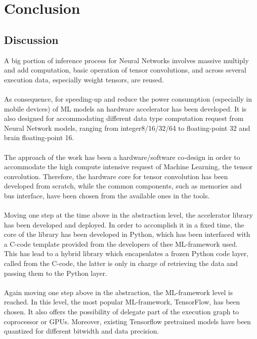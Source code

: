 \chapter{Conclusion}

\section{Discussion}A big portion of inference process for Neural Networks involves massive multiply and add computation, basic operation of tensor convolutions, and across several execution data, especially weight tensors, are reused.\\\\
As consequence, for speeding-up and reduce the power consumption (especially in mobile devices) of ML models an hardware accelerator has been developed.
It is also designed for accommodating different data type computation request from Neural Network models, ranging from integer8/16/32/64 to floating-point 32 and brain floating-point 16.\\\\

The approach of the work has been a hardware/software co-design in order to accommodate the high compute intensive request of Machine Learning, the tensor convolution. Therefore, the hardware core for tensor convolution has been developed from scratch, while the common components, such as memories and bus interface, have been chosen from the available ones in the tools.\\\\
Moving one step at the time above in the abstraction level, the accelerator library has been developed and deployed. In order to accomplish it in a fixed time, the core of the library has been developed in Python, which has been interfaced with a C-code template provided from the developers of thee ML-framework used. This has lead to a hybrid library which encapsulates a frozen Python code layer, called from the C-code, the latter is only in charge of retrieving the data and passing them to the Python layer.\\\\
Again moving one step above in the abstraction, the ML-framework level is reached. In this level, the most popular ML-framework, TensorFlow, has been chosen. It also offers the possibility of delegate part of the execution graph to coprocessor or GPUs. Moreover, existing Tensorflow pretrained models have been quantized for different bitwidth and data precision.\\\\

